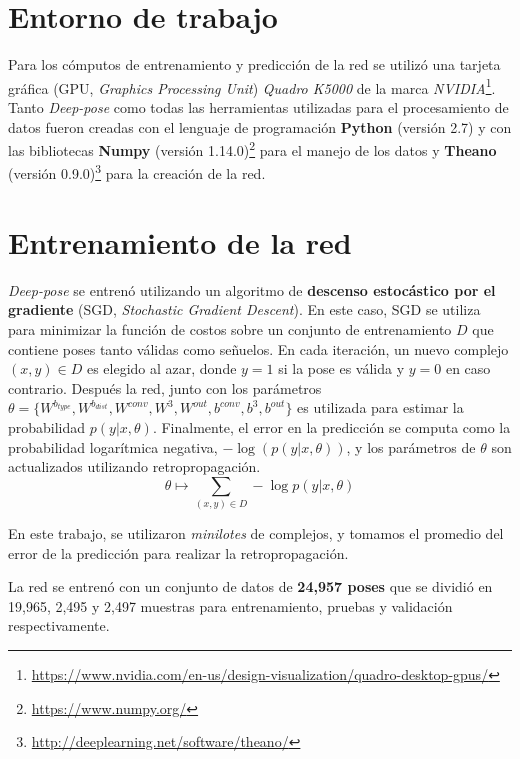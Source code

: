 \section{Entorno de trabajo}
Para los cómputos de entrenamiento y predicción de la red se utilizó
una tarjeta gráfica (GPU, \textit{Graphics Processing
Unit}) \textit{Quadro K5000} de la marca
\textit{NVIDIA}\footnote{\url{https://www.nvidia.com/en-us/design-visualization/quadro-desktop-gpus/}}.
Tanto \textit{Deep-pose} como todas las herramientas utilizadas
para el procesamiento de datos fueron creadas con el lenguaje de
programación \textbf{Python} (versión 2.7) y con las bibliotecas
\textbf{Numpy} (versión 1.14.0)\footnote{\url{https://www.numpy.org/}}
para el manejo de los datos y \textbf{Theano} (versión
0.9.0)\footnote{\url{http://deeplearning.net/software/theano/}} para la creación
de la red.

\section{Entrenamiento de la red}
\textit{Deep-pose} se entrenó utilizando un algoritmo de
\textbf{descenso estocástico por el gradiente}
(SGD, \textit{Stochastic Gradient Descent}).
En este caso, SGD se utiliza para minimizar la función de costos sobre
un conjunto de entrenamiento $D$ que contiene poses tanto válidas como
señuelos. En cada iteración, un nuevo complejo $(x,y) \in D$ es
elegido al azar, donde $y=1$ si la pose es válida y $y=0$ en caso
contrario. Después la red, junto con los parámetros $\theta
= \{W^{b_{type}}, W^{b_{dist}}, W^{conv}, W^3, W^{out}, b^{conv},
b^{3}, b^{out}\}$ es utilizada para estimar la probabilidad
$p(y|x, \theta)$. Finalmente, el error en la predicción se computa
como la probabilidad logarítmica negativa, $-\log(p(y|x, \theta))$, y
los parámetros de $\theta$ son actualizados
utilizando retropropagación.
\begin{equation}
  \theta \longmapsto \sum_{(x,y) \in D} -\log p(y|x, \theta)
\end{equation}

En este trabajo, se utilizaron \textit{minilotes} de complejos, y
tomamos el promedio del error de la predicción para realizar la
retropropagación.

La red se entrenó con un conjunto de datos de \textbf{24,957 poses}
que se dividió en 19,965, 2,495 y 2,497 muestras para entrenamiento,
pruebas y validación respectivamente.

